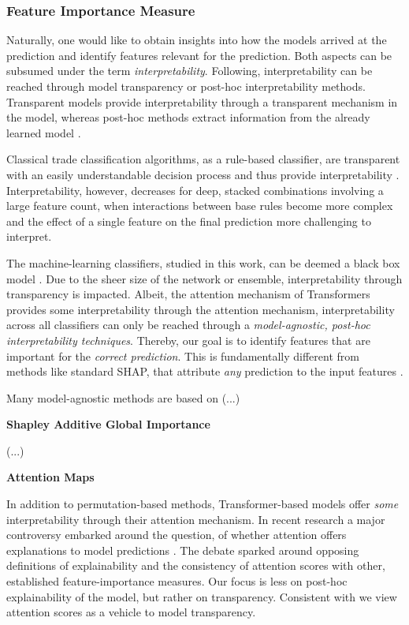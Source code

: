 \subsubsection{Feature Importance
    Measure}\label{sec:feature-importance-measure}

Naturally, one would like to obtain insights into how the models arrived at the prediction and identify features relevant for the prediction. Both aspects can be subsumed under the term \emph{interpretability}. Following, \textcite[][4]{liptonMythosModelInterpretability2017} interpretability can be reached through model transparency or post-hoc interpretability methods. Transparent models provide interpretability through a transparent mechanism in the model, whereas post-hoc methods extract information from the already learned model \autocite[][4--5]{liptonMythosModelInterpretability2017}.

Classical trade classification algorithms, as a rule-based classifier, are transparent with an easily understandable decision process and thus provide interpretability \autocite[][91]{barredoarrietaExplainableArtificialIntelligence2020}. Interpretability, however, decreases for deep, stacked combinations involving a large feature count, when interactions between base rules become more complex and the effect of a single feature on the final prediction more challenging to interpret.

The machine-learning classifiers, studied in this work, can be deemed a black box model \autocite[][90]{barredoarrietaExplainableArtificialIntelligence2020}. Due to the sheer size of the network or ensemble, interpretability through transparency is impacted. Albeit, the attention mechanism of Transformers provides some interpretability through the attention mechanism,  interpretability across all classifiers can only be reached through a \emph{model-agnostic, post-hoc interpretability techniques}. Thereby, our goal is to identify features that are important for the \emph{correct prediction}. This is fundamentally different from methods like standard \gls{SHAP}, that attribute \emph{any} prediction to the input features \autocite[][??]{chenTrueModelTrue2020}.

Many model-agnostic methods are based on (...)

\textbf{Shapley Additive Global Importance}

(...)

\textbf{Attention Maps}

In addition to permutation-based methods, Transformer-based models offer \emph{some} interpretability through their attention mechanism. In recent research a major controversy embarked around the question, of whether attention offers explanations to model predictions \autocites[cp.][150]{bastingsElephantInterpretabilityRoom2020}[][5--7]{jainAttentionNotExplanation2019}[][9]{wiegreffeAttentionNotNot2019}. The debate sparked around opposing definitions of explainability and the consistency of attention scores with other, established feature-importance measures. Our focus is less on post-hoc explainability of the model, but rather on transparency. Consistent with \textcite[][8]{wiegreffeAttentionNotNot2019} we view attention scores as a vehicle to model transparency.

